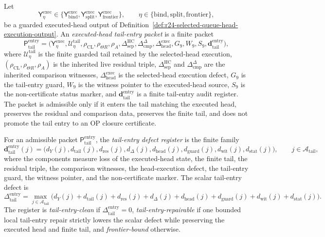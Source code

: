\begin{definition}
\label{def:executed-head-tail-entry-packet}
Let
\[
  \mathsf Y_{\eta}^{\mathrm{exec}}
  \in
  \{\mathsf Y_{\mathrm{bind}}^{\mathrm{exec}},
    \mathsf Y_{\mathrm{split}}^{\mathrm{exec}},
    \mathsf Y_{\mathrm{frontier}}^{\mathrm{exec}}\},
  \qquad
  \eta\in\{\mathrm{bind},\mathrm{split},\mathrm{frontier}\},
\]
be a guarded executed-head output of Definition~\ref{def:r24-selected-queue-head-execution-output}.  An \emph{executed-head tail-entry packet} is a finite packet
\[
  \mathsf P_{\mathrm{tail}}^{\mathrm{entry}}
  =
  \bigl(
    \mathsf Y_{\eta}^{\mathrm{exec}},
    \mathcal U_{\eta}^{\mathrm{tail}},
    \rho_{\mathrm{CL}},\rho_{\Theta R},\rho_A,
    \Delta_{\mathrm{sep}}^{\mathrm{HC}},
    \Delta_{\mathrm{cmp}}^{\Delta},
    \Delta_{\mathrm{head}}^{\mathrm{exec}},
    G_9,W_9,S_9,
    \mathbf d_{\mathrm{tail}}^{\mathrm{entry}}
  \bigr),
\]
where \(\mathcal U_{\eta}^{\mathrm{tail}}\) is the finite guarded tail retained by the selected-head execution, \((\rho_{\mathrm{CL}},\rho_{\Theta R},\rho_A)\) is the inherited live residual triple, \(\Delta_{\mathrm{sep}}^{\mathrm{HC}}\) and \(\Delta_{\mathrm{cmp}}^{\Delta}\) are the inherited comparison witnesses, \(\Delta_{\mathrm{head}}^{\mathrm{exec}}\) is the selected-head execution defect, \(G_9\) is the tail-entry guard, \(W_9\) is the witness pointer to the executed-head source, \(S_9\) is the non-certificate status marker, and \(\mathbf d_{\mathrm{tail}}^{\mathrm{entry}}\) is a finite tail-entry audit register.  The packet is admissible only if it enters the tail matching the executed head, preserves the residual and comparison data, preserves the finite tail, and does not promote the tail entry to an OP closure certificate.
\end{definition}

\begin{definition}
\label{def:executed-head-tail-entry-defect}
For an admissible packet \(\mathsf P_{\mathrm{tail}}^{\mathrm{entry}}\), the \emph{tail-entry defect register} is the finite family
\[
  \mathbf d_{\mathrm{tail}}^{\mathrm{entry}}(j)
  =
  \bigl(d_Y(j),d_{\mathrm{tail}}(j),d_{\mathrm{res}}(j),d_{\Delta}(j),
        d_{\mathrm{head}}(j),d_{\mathrm{guard}}(j),d_{\mathrm{wit}}(j),d_{\mathrm{stat}}(j)\bigr),
  \qquad j\in\mathcal A_{\mathrm{tail}},
\]
where the components measure loss of the executed-head state, the finite tail, the residual triple, the comparison witnesses, the head-execution defect, the tail-entry guard, the witness pointer, and the non-certificate marker.  The scalar tail-entry defect is
\[
  \Delta_{\mathrm{tail}}^{\mathrm{entry}}
  =
  \max_{j\in\mathcal A_{\mathrm{tail}}}
  \bigl(d_Y(j)+d_{\mathrm{tail}}(j)+d_{\mathrm{res}}(j)+d_{\Delta}(j)+d_{\mathrm{head}}(j)
        +d_{\mathrm{guard}}(j)+d_{\mathrm{wit}}(j)+d_{\mathrm{stat}}(j)\bigr).
\]
The register is \emph{tail-entry-clean} if \(\Delta_{\mathrm{tail}}^{\mathrm{entry}}=0\), \emph{tail-entry-repairable} if one bounded local tail-entry repair strictly lowers the scalar defect while preserving the executed head and finite tail, and \emph{frontier-bound} otherwise.
\end{definition}

